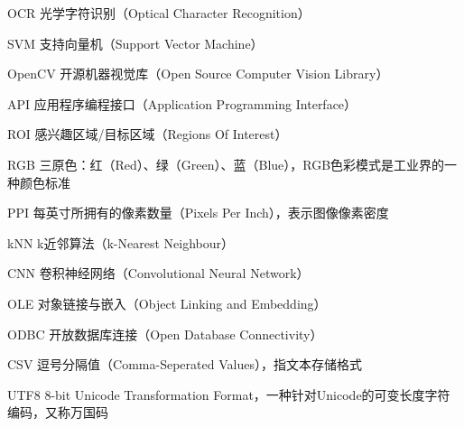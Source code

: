 ﻿\begin{denotation}
  \item[OCR] 光学字符识别（Optical Character Recognition）
  \item[SVM] 支持向量机（Support Vector Machine）
  \item[OpenCV] 开源机器视觉库（Open Source Computer Vision Library）
  \item[API] 应用程序编程接口（Application Programming Interface）
  \item[ROI] 感兴趣区域/目标区域（Regions Of Interest）
  \item[RGB] 三原色：红（Red）、绿（Green）、蓝（Blue），RGB色彩模式是工业界的一种颜色标准
  \item[PPI] 每英寸所拥有的像素数量（Pixels Per Inch），表示图像像素密度
  \item[kNN] k近邻算法（k-Nearest Neighbour）
  \item[CNN] 卷积神经网络（Convolutional Neural Network）
  \item[OLE] 对象链接与嵌入（Object Linking and Embedding）
  \item[ODBC] 开放数据库连接（Open Database Connectivity）
  \item[CSV] 逗号分隔值（Comma-Seperated Values），指文本存储格式
  \item[UTF8] 8-bit Unicode Transformation Format，一种针对Unicode的可变长度字符编码，又称万国码
\end{denotation}
